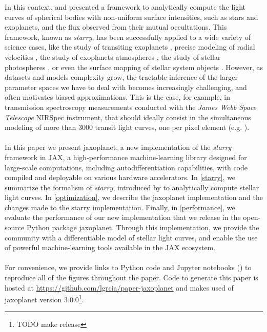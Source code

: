 \documentclass[modern]{aastex631}
\begin{document}
In this context, \cite{starry} and \cite{Agol2020} presented a framework to analytically compute the light curves of spherical bodies with non-uniform surface intensities, such as stars and exoplanets, and the flux observed from their mutual occultations. This framework, known as \textit{starry}, has been successfully applied to a wide variety of science cases, like the study of transiting exoplanets \citep{Kostov2019}, precise modeling of radial velocities \citep{Dawson2021}, the study of exoplanets atmospheres \citep{Bell2023}, the study of stellar photospheres \citep{Almenara2022}, or even the surface mapping of stellar system objects \citep{Bartolic2022}. However, as datasets and models complexity grow, the tractable inference of the larger parameter spaces we have to deal with becomes increasingly challenging, and often motivates biased approximations. This is the case, for example, in transmission spectroscopy measurements conducted with the \textit{James Webb Space Telescope} NIRSpec instrument, that should ideally consist in the simultaneous modeling of more than 3000 transit light curves, one per pixel element (e.g. \citealt{Alderson2023}).\\\\
In this paper we present \textsf{jaxoplanet}, a new implementation of the \textit{starry} framework in \textsf{JAX}, a high-performance machine-learning library designed for large-scale computations, including autodifferentiation capabilities, with code compiled and deployable on various hardware accelerators. In \autoref{starry}, we summarize the formalism of \textit{starry}, introduced by \cite{starry} to analytically compute stellar light curves. In \autoref{optimization}, we describe the \textsf{jaxoplanet} implementation and the changes made to the \textsf{starry} implementation. Finally, in \autoref{performance}, we evaluate the performance of our new implementation that we release in the open-source Python package \textsf{jaxoplanet}. Through this implementation, we provide the community with a differentiable model of stellar light curves, and enable the use of powerful machine-learning tools available in the \textsf{JAX} ecosystem.\\\\
For convenience, we provide links to Python code and Jupyter notebooks (\;\codelink{}) to reproduce all of the figures throughout the paper. Code to generate this paper is hosted at \href{https://github.com/lgrcia/paper-jaxoplanet}{https://github.com/lgrcia/paper-jaxoplanet} and makes used of \textsf{jaxoplanet} version 3.0.0\footnote{TODO make release}.
\end{document}
